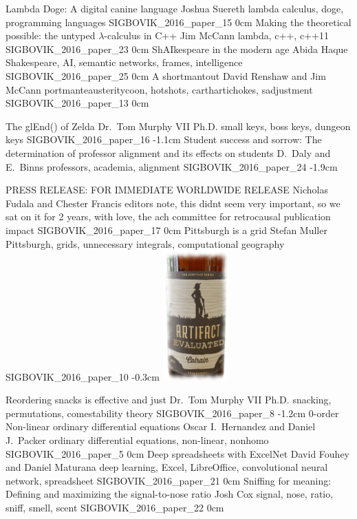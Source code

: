 \addpaper
	{Lambda Doge: A digital canine language}
	{Joshua Suereth}
	{lambda calculus, doge, programming languages}
	{SIGBOVIK_2016_paper_15}
	{0cm}
	{}
\addpaper
	{Making the theoretical possible: the untyped $\lambda$-calculus in C++}
	{Jim McCann}
	{lambda, c++, c++11}
	{SIGBOVIK_2016_paper_23}
	{0cm}
	{}
\addpaper
	{ShAIkespeare in the modern age}
	{Abida Haque}
	{Shakespeare, AI, semantic networks, frames, intelligence}
	{SIGBOVIK_2016_paper_25}
	{0cm}
	{}
\addpaper
	{A shortmantout}
	{David Renshaw and Jim McCann}
	{portmanteausteritycoon, hotshots, carthartichokes, sadjustment}
	{SIGBOVIK_2016_paper_13}
	{0cm}
	{}

\addpaper
	{The glEnd() of Zelda}
	{Dr.\ Tom Murphy VII Ph.D.}
	{small keys, boss keys, dungeon keys}
	{SIGBOVIK_2016_paper_16}
	{-1.1cm}
	{}
\addpaper
	{Student success and sorrow: The determination of professor alignment and its effects on students}
	{D.\ Daly and E.\ Binns}
	{professors, academia, alignment}
	{SIGBOVIK_2016_paper_24}
	{-1.9cm}
	{}

\addpaper
	{PRESS RELEASE: FOR IMMEDIATE WORLDWIDE RELEASE}
	{Nicholas Fudala and Chester Francis}
	{editors note, this didnt seem very important, so we sat on it for 2 years, with love, the ach committee for retrocausal publication impact}
	{SIGBOVIK_2016_paper_17}
	{0cm}
	{}
\addpaper
	{Pittsburgh is a grid}
	{Stefan Muller}
	{Pittsburgh, grids, unnecessary integrals, computational geography}
	{SIGBOVIK_2016_paper_10}
	{-0.3cm}
	{\includegraphics[width=1in]{eval}}

\addpaper
	{Reordering snacks is effective and just}
	{Dr.\ Tom Murphy VII Ph.D.}
	{snacking, permutations, comestability theory}
	{SIGBOVIK_2016_paper_8}
	{-1.2cm}
	{}
\addpaper
	{0-order Non-linear ordinary differential equations}
	{Oscar I.\ Hernandez and Daniel J.\ Packer}
	{ordinary differential equations, non-linear, nonhomo}
	{SIGBOVIK_2016_paper_5}
	{0cm}
	{}
\addpaper
	{Deep spreadsheets with ExcelNet}
	{David Fouhey and Daniel Maturana}
	{deep learning, Excel, LibreOffice, convolutional neural network, spreadsheet}
	{SIGBOVIK_2016_paper_21}
	{0cm}
	{}
\addpaper
	{Sniffing for meaning: Defining and maximizing the signal-to-nose ratio}
	{Josh Cox}
	{signal, nose, ratio, sniff, smell, scent}
	{SIGBOVIK_2016_paper_22}
	{0cm}
	{}

